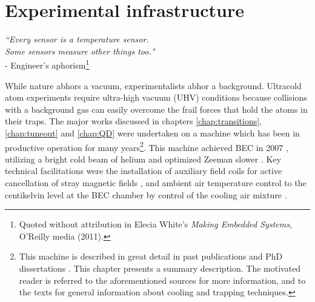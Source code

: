 
\chapter{Experimental infrastructure}
\label{chap:apparatus}
	\begin{adjustwidth}{0cm}{0cm}
	\begin{flushright}
	\singlespacing
	\emph{``Every sensor is a temperature sensor.\\
	 Some sensors measure other things too."\\} 
	- Engineer's aphorism\footnote{Quoted without attribution in Elecia White's \emph{Making Embedded Systems}, O'Reilly media (2011).}
	\end{flushright}
	\end{adjustwidth}
	\onehalfspacing
	\vspace{1cm}
	{While} nature abhors a vacuum, experimentalists abhor a background.
	Ultracold atom experiments require ultra-high vacuum (UHV) conditions because collisions with a background gas can easily overcome the frail forces that hold the atoms in their traps.
	The major works discussed in chapters \ref{chap:transitions},  \ref{chap:tuneout} and \ref{chap:QD} were undertaken on a machine which has been in productive operation for many years\footnote{This machine is described in great detail in past publications \cite{Swansson04,Dall07_BEC} and PhD dissertations \cite{HodgmanThesis,ManningThesis,ShinThesis,DallThesis}.
	This chapter presents a summary description. The motivated reader is referred to the aforementioned sources for more information, and to the texts \cite{FootAtomic,MetVdS} for general information about cooling and trapping techniques.}.
	This machine achieved BEC in 2007 \cite{Dall07_BEC}, utilizing a bright cold beam of helium \cite{Swansson04} and optimized Zeeman slower \cite{Dedman04}.
	Key technical facilitations were the installation of auxiliary field coils for active cancellation of stray magnetic fields \cite{Dedman04}, and ambient air temperature control to the centikelvin level at the BEC chamber by control of the cooling air mixture \cite{Dedman15}.
